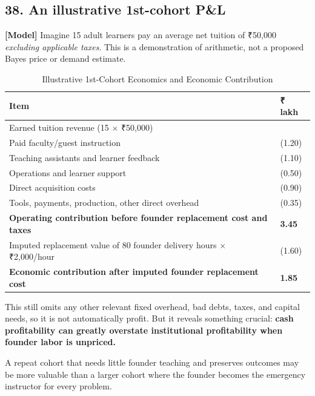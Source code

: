 \subsection{38. An illustrative 1st-cohort P\&L}

\textbf{\textbf{[Model]}} Imagine 15 adult learners pay an average net tuition of \textnormal{₹}50,000 \textit{excluding applicable taxes}. This is a demonstration of arithmetic, not a proposed Bayes price or demand estimate.

\begin{table}[t]
\centering
\small
\caption{Illustrative 1st-Cohort Economics and Economic Contribution}
\label{tab:ch36_cohort_pnl}
\begin{tabularx}{\textwidth}{p{10.5cm} >{\raggedleft\arraybackslash}X}
\toprule
\textbf{ Item } & \textbf{ \textnormal{₹} lakh } \\
\midrule
 Earned tuition revenue (15 $\times$ \textnormal{₹}50,000)  &  7.50  \\
 Paid faculty/\allowbreak guest instruction  &  (1.20)  \\
 Teaching assistants and learner feedback  &  (1.10)  \\
 Operations and learner support  &  (0.50)  \\
 Direct acquisition costs  &  (0.90)  \\
 Tools, payments, production, other direct overhead  &  (0.35)  \\
 \textbf{Operating contribution before founder replacement cost and taxes}  &  \textbf{3.45}  \\
 Imputed replacement value of 80 founder delivery hours $\times$ \textnormal{₹}2,000/\allowbreak hour  &  (1.60)  \\
 \textbf{Economic contribution after imputed founder replacement cost}  &  \textbf{1.85}  \\
\bottomrule
\end{tabularx}
\end{table}

This still omits any other relevant fixed overhead, bad debts, taxes, and capital needs, so it is not automatically profit. But it reveals something crucial: \textbf{cash profitability can greatly overstate institutional profitability when founder labor is unpriced.}

A repeat cohort that needs little founder teaching and preserves outcomes may be more valuable than a larger cohort where the founder becomes the emergency instructor for every problem.

